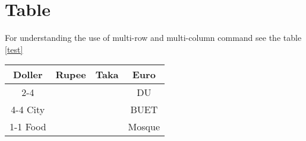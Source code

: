 \documentclass[18pt,a4paper]{article}
\begin{document}
\section{Table}
For understanding the use of multi-row and multi-column command see the
table \ref{test}
\begin{table*}[h!]
	
	\begin{tabular}{|c|ccc|}
		
		\hline 
		\multirow{2}{*}{Doller} & \multicolumn{1}{|c|}{Rupee} & \multicolumn{1}{|c|}{Taka} & Euro \\
		\cline{2-4}
								&\multicolumn{2}{|c}{ \multirow{3}{*}{Dhaka} } 	& \multicolumn{1}{|c|}{DU} \\
								\cline{4-4}
		City					&\multicolumn{2}{|c}{}							& BUET \\
		\cline{1-1}
		\cline{4-4}
		Food					&\multicolumn{2}{|c}{}							&\multicolumn{1}{|c|}{Mosque}\\
		\hline
		
	\end{tabular}
	\caption{A table for online test}
	\label{test}
\end{table*}
\end{document}
